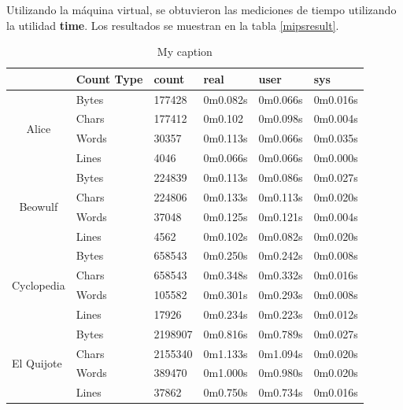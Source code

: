 Utilizando la m\'aquina virtual, se obtuvieron las mediciones de tiempo utilizando la utilidad \textbf{time}. Los resultados se muestran en la tabla \ref{mipsresult}.


\begin{table}[]
\centering
\caption{My caption}
\label{my-label}
\begin{tabular}{l|l|l|l|l|l|}
\cline{2-6}
                                                  & Count Type & count   & real     & user     & sys      \\ \hline \hline
\multicolumn{1}{|c|}{\multirow{4}{*}{Alice}}      & Bytes      & 177428  & 0m0.082s & 0m0.066s & 0m0.016s \\ \cline{2-6} 
\multicolumn{1}{|c|}{}                            & Chars      & 177412  & 0m0.102  & 0m0.098s & 0m0.004s \\ \cline{2-6} 
\multicolumn{1}{|c|}{}                            & Words      & 30357   & 0m0.113s & 0m0.066s & 0m0.035s \\ \cline{2-6} 
\multicolumn{1}{|c|}{}                            & Lines      & 4046    & 0m0.066s & 0m0.066s & 0m0.000s \\ \hline
\multicolumn{1}{|c|}{\multirow{4}{*}{Beowulf}}    & Bytes      & 224839  & 0m0.113s & 0m0.086s & 0m0.027s \\ \cline{2-6} 
\multicolumn{1}{|c|}{}                            & Chars      & 224806  & 0m0.133s & 0m0.113s & 0m0.020s \\ \cline{2-6} 
\multicolumn{1}{|c|}{}                            & Words      & 37048   & 0m0.125s & 0m0.121s & 0m0.004s \\ \cline{2-6} 
\multicolumn{1}{|c|}{}                            & Lines      & 4562    & 0m0.102s & 0m0.082s & 0m0.020s \\ \hline
\multicolumn{1}{|l|}{\multirow{4}{*}{Cyclopedia}} & Bytes      & 658543  & 0m0.250s & 0m0.242s & 0m0.008s \\ \cline{2-6} 
\multicolumn{1}{|l|}{}                            & Chars      & 658543  & 0m0.348s & 0m0.332s & 0m0.016s \\ \cline{2-6} 
\multicolumn{1}{|l|}{}                            & Words      & 105582  & 0m0.301s & 0m0.293s & 0m0.008s \\ \cline{2-6} 
\multicolumn{1}{|l|}{}                            & Lines      & 17926   & 0m0.234s & 0m0.223s & 0m0.012s \\ \hline
\multicolumn{1}{|l|}{\multirow{4}{*}{El Quijote}} & Bytes      & 2198907 & 0m0.816s & 0m0.789s & 0m0.027s \\ \cline{2-6} 
\multicolumn{1}{|l|}{}                            & Chars      & 2155340 & 0m1.133s & 0m1.094s & 0m0.020s \\ \cline{2-6} 
\multicolumn{1}{|l|}{}                            & Words      & 389470  & 0m1.000s & 0m0.980s & 0m0.020s \\ \cline{2-6} 
\multicolumn{1}{|l|}{}                            & Lines      & 37862   & 0m0.750s & 0m0.734s & 0m0.016s \\ \hline
\end{tabular}
\end{table}

